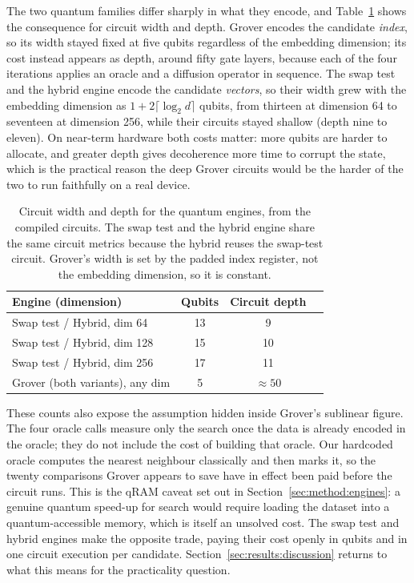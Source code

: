 The two quantum families differ sharply in what they encode, and
Table~\ref{tab:circuitcost} shows the consequence for circuit width and depth.
Grover encodes the candidate \emph{index}, so its width stayed fixed at five
qubits regardless of the embedding dimension; its cost instead appears as depth,
around fifty gate layers, because each of the four iterations applies an oracle
and a diffusion operator in sequence. The swap test and the hybrid engine encode
the candidate \emph{vectors}, so their width grew with the embedding dimension as
$1 + 2\lceil \log_2 d \rceil$ qubits, from thirteen at dimension 64 to seventeen
at dimension 256, while their circuits stayed shallow (depth nine to eleven). On
near-term hardware both costs matter: more qubits are harder to allocate, and
greater depth gives decoherence more time to corrupt the state, which is the
practical reason the deep Grover circuits would be the harder of the two to run
faithfully on a real device.

\begin{table}[htbp]
  \centering
  \caption[Quantum circuit width and depth]{Circuit width and depth for the
  quantum engines, from the compiled
  circuits. The swap test and the hybrid engine share the same circuit metrics
  because the hybrid reuses the swap-test circuit. Grover's width is set by the
  padded index register, not the embedding dimension, so it is constant.}
  \label{tab:circuitcost}
  \begin{tabularx}{\linewidth}{Xccc}
    \toprule
    \textbf{Engine (dimension)} & \textbf{Qubits} & \textbf{Circuit depth} \\
    \midrule
    Swap test / Hybrid, dim 64   & 13 & 9 \\
    Swap test / Hybrid, dim 128  & 15 & 10 \\
    Swap test / Hybrid, dim 256  & 17 & 11 \\
    \addlinespace
    Grover (both variants), any dim & 5 & $\approx 50$ \\
    \bottomrule
  \end{tabularx}
\end{table}

These counts also expose the assumption hidden inside Grover's sublinear figure.
The four oracle calls measure only the search once the data is already encoded in
the oracle; they do not include the cost of building that oracle. Our hardcoded
oracle computes the nearest neighbour classically and then marks it, so the
twenty comparisons Grover appears to save have in effect been paid before the
circuit runs. This is the qRAM caveat set out in Section~\ref{sec:method:engines}:
a genuine quantum speed-up for search would require loading the dataset into a
quantum-accessible memory, which is itself an unsolved cost. The swap test and
hybrid engines make the opposite trade, paying their cost openly in qubits and in
one circuit execution per candidate. Section~\ref{sec:results:discussion} returns
to what this means for the practicality question.


